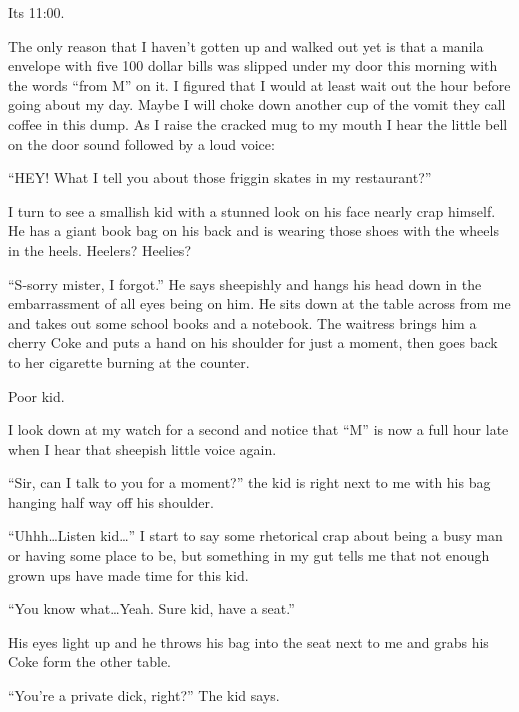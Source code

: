 Its 11:00.



The only reason that I haven't gotten up and walked out yet is that
a manila envelope with five 100 dollar bills was slipped under my
door this morning with the words ``from M'' on it. I figured that I
would at least wait out the hour before going about my day. Maybe I
will choke down another cup of the vomit they call coffee in this
dump. As I raise the cracked mug to my mouth I hear the little bell
on the door sound followed by a loud voice:



``HEY! What I tell you about those friggin skates in my
restaurant?''

I turn to see a smallish kid with a stunned look on his face nearly
crap himself. He has a giant book bag on his back and is wearing
those shoes with the wheels in the heels. Heelers? Heelies?



``S-sorry mister, I forgot.'' He says sheepishly and hangs his head
down in the embarrassment of all eyes being on him. He sits down at
the table across from me and takes out some school books and a
notebook. The waitress brings him a cherry Coke and puts a hand on
his shoulder for just a moment, then goes back to her cigarette
burning at the counter.



Poor kid.



I look down at my watch for a second and notice that ``M'' is now a
full hour late when I hear that sheepish little voice again.



``Sir, can I talk to you for a moment?'' the kid is right next to me
with his bag hanging half way off his shoulder.



``Uhhh{\ldots}Listen kid{\ldots}'' I start to say some rhetorical crap about
being a busy man or having some place to be, but something in my
gut tells me that not enough grown ups have made time for this
kid.



``You know what{\ldots}Yeah. Sure kid, have a seat.''

His eyes light up and he throws his bag into the seat next to me
and grabs his Coke form the other table.



``You're a private dick, right?'' The kid says.



